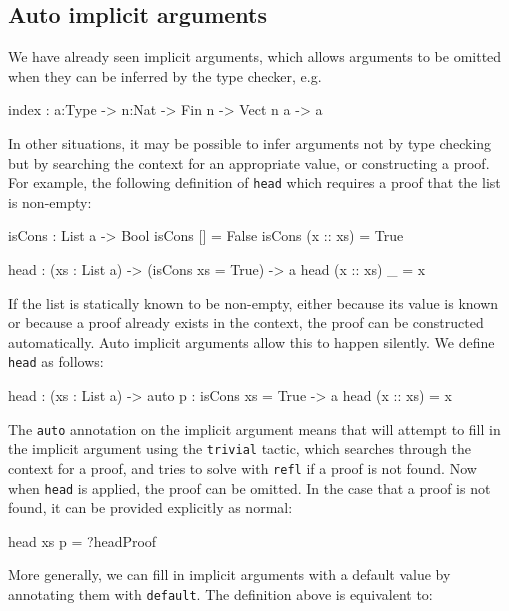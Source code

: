 \subsection{Auto implicit arguments}

We have already seen implicit arguments, which allows arguments to be omitted when they can be inferred by the type checker, e.g.\

\begin{code}
index : {a:Type} -> {n:Nat} -> Fin n -> Vect n a -> a
\end{code}

\noindent
In other situations, it may be possible to infer arguments not by type checking but by searching the context for an appropriate value, or constructing a proof.
For example, the following definition of \texttt{head} which requires a proof that the list is non-empty:

\begin{code}
isCons : List a -> Bool
isCons [] = False
isCons (x :: xs) = True

head : (xs : List a) -> (isCons xs = True) -> a
head (x :: xs) _ = x
\end{code} 

\noindent
If the list is statically known to be non-empty, either because its value is known or because a proof already exists in the context, the proof can be constructed automatically.
Auto implicit arguments allow this to happen silently.
We define \texttt{head} as follows:

\begin{code}
head : (xs : List a) -> {auto p : isCons xs = True} -> a
head (x :: xs) = x
\end{code} 

\noindent
The \texttt{auto} annotation on the implicit argument means that \Idris{} will attempt to fill in the implicit argument using the \texttt{trivial} tactic, which searches through the context for a proof, and tries to solve with \texttt{refl} if a proof is not found.
Now when \texttt{head} is applied, the proof can be omitted.
In the case that a proof is not found, it can be provided explicitly as normal:

\begin{code}
head xs {p = ?headProof} 
\end{code} 

\noindent
More generally, we can fill in implicit arguments with a default value by annotating them with \texttt{default}.
The definition above is equivalent to:

